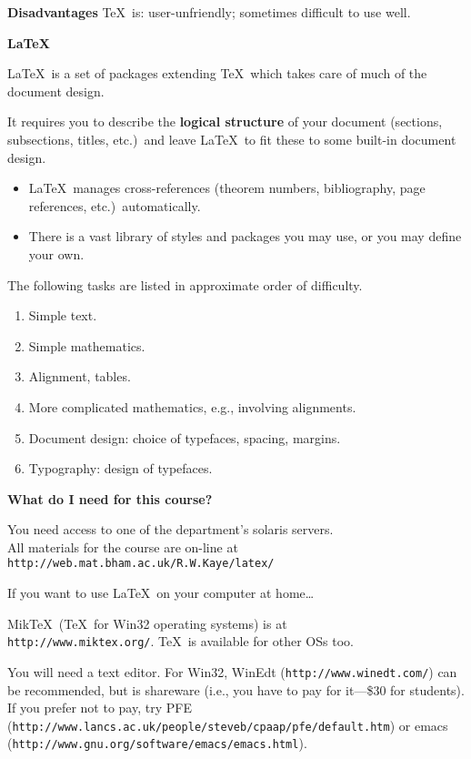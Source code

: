 \documentclass[a4paper,landscape]{slides}
\begin{document}
\textbf{Disadvantages} \TeX\ is: user-unfriendly;
 sometimes difficult to use well.

\newpage

\textbf{\LaTeX}

\LaTeX\ is a set of packages extending \TeX\ which 
takes care of much of the document design.

It requires you to describe the \textbf{logical structure} 
of your document (sections, subsections, titles, etc.)~and 
leave \LaTeX\ to fit these to some built-in document design.  

\begin{itemize}
\item \LaTeX\ manages cross-references (theorem numbers, 
bibliography, page references, etc.)~automatically.
\item There is a vast library of styles and packages you may use, 
or you may define your own.
\end{itemize}

\newpage

The following tasks are listed in approximate order of difficulty.
\begin{enumerate}\itemsep=0pt
\item Simple text.
\item Simple mathematics.
\item Alignment, tables.
\item More complicated mathematics, e.g., involving alignments.
\item Document design: choice of typefaces, spacing, margins.
\item Typography: design of typefaces.
\end{enumerate}

\newpage

\textbf{What do I need for this course?}

You need access to one of the department's solaris servers.\\
All materials for the course are on-line at\\
\texttt{http://web.mat.bham.ac.uk/R.W.Kaye/latex/}

\begin{small}

If you want to use \LaTeX\ on your computer at home\ldots

Mik\TeX\ (\TeX\ for Win32 operating systems) is at\\
\texttt{http://www.miktex.org/}.  \TeX\ is available
for other OSs too.

You will need a text editor.  For Win32, WinEdt 
(\texttt{http://www.winedt.com/}) can
be recommended, but is shareware (i.e., you have to pay for
it---\$30 for students). If you prefer not to
pay, try PFE 
(\texttt{http://www.lancs.ac.uk/people/steveb/cpaap/pfe/default.htm})
or emacs (\texttt{http://www.gnu.org/software/emacs/emacs.html}).

\end{small}
\end{document}
